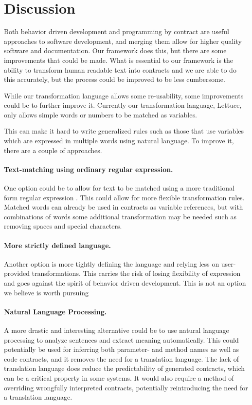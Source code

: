 \section{Discussion}
Both behavior driven development and programming by contract are useful approaches to software development, and merging them allow for higher quality software and documentation.
Our framework does this, but there are some improvements that could be made.
What is essential to our framework is the ability to transform human readable text into contracts and we are able to do this accurately, but the process could be improved to be less cumbersome.

While our transformation language allows some re-usability, some improvements could be to further improve it.
Currently our transformation language, Lettuce, only allows simple words or numbers to be matched as variables.

This can make it hard to write generalized rules such as those that use variables which are expressed in multiple words using natural language.
To improve it, there are a couple of approaches.

\paragraph{Text-matching using ordinary regular expression.}
One option could be to allow for text to be matched using a more traditional form regular expression \cite{thompson1968programming}.
This could allow for more flexible transformation rules.
Matched words can already be used in contracts as variable references, but with combinations of words some additional transformation may be needed such as removing spaces and special characters.

\paragraph{More strictly defined language.}
Another option is more tightly defining the language and relying less on user-provided transformations.
This carries the risk of losing flexibility of expression and goes against the spirit of behavior driven development.
This is not an option we believe is worth pursuing

\paragraph{Natural Language Processing.}
A more drastic and interesting alternative could be to use natural language processing \cite{jurafsky2002speech} to analyze sentences and extract meaning automatically.
This could potentially be used for inferring both parameter- and method names as well as code contracts, and it removes the need for a translation language.
The lack of translation language does reduce the predictability of generated contracts, which can be a critical property in some systems.
It would also require a method of overriding wrongfully interpreted contracts, potentially reintroducing the need for a translation language.

